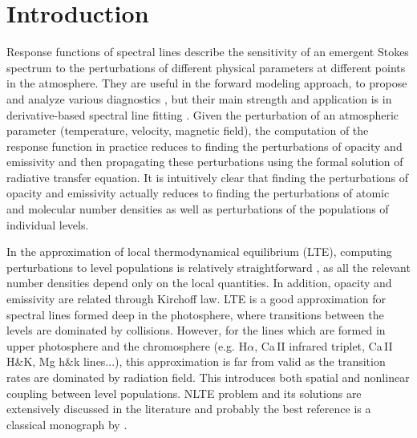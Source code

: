 \documentclass[referee]{aa}
\begin{document}

   \maketitle


\section{Introduction}

Response functions of spectral lines \citep{Mein71, Beckers75, Landi77} describe the sensitivity of an emergent Stokes spectrum to the perturbations of different physical parameters at different points in the atmosphere. They are useful in the forward modeling approach, to propose and analyze various diagnostics \citep{Han06}, but their main strength and application is in derivative-based spectral line fitting \citep[in solar physics widely known as ``inversion'', see for example][]{SIR}. Given the perturbation of an atmospheric parameter (temperature, velocity, magnetic field), the computation of the response function in practice reduces to finding the perturbations of opacity and emissivity and then propagating these perturbations using the formal solution of radiative transfer equation. It is intuitively clear that finding the perturbations of opacity and emissivity actually reduces to finding the perturbations of atomic and molecular number densities as well as perturbations of the populations of individual levels. 

In the approximation of local thermodynamical equilibrium (LTE), computing perturbations to level populations is relatively straightforward \citep[see, for example][]{SIR, dtibook}, as all the relevant number densities depend only on the local quantities. In addition, opacity and emissivity are related through Kirchoff law. LTE is a good approximation for spectral lines formed deep in the photosphere, where transitions between the levels are dominated by collisions. However, for the lines which are formed in upper photosphere and the chromosphere (e.g. H$\alpha$, Ca\,II infrared triplet, Ca\,II H\&K, Mg h\&k lines...), this approximation is far from valid as the transition rates are dominated by radiation field. This introduces both spatial and nonlinear coupling between level populations. NLTE problem and its solutions are extensively discussed in the literature and probably the best reference is a classical monograph by \citet{Mihalasbook} \citep[or a recent re-issue by][]{SAbook2014}.
\end{document}
